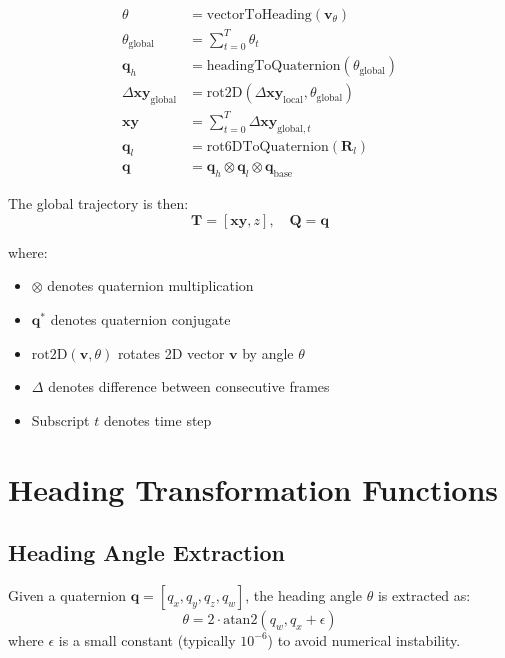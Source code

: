 \begin{align}
    \theta &= \text{vectorToHeading}(\mathbf{v}_{\theta}) \\
    \theta_{\text{global}} &= \sum_{t=0}^T \theta_t \\
    \mathbf{q}_h &= \text{headingToQuaternion}(\theta_{\text{global}}) \\
    \Delta\mathbf{xy}_{\text{global}} &= \text{rot2D}(\Delta\mathbf{xy}_{\text{local}}, \theta_{\text{global}}) \\
    \mathbf{xy} &= \sum_{t=0}^T \Delta\mathbf{xy}_{\text{global},t} \\
    \mathbf{q}_l &= \text{rot6DToQuaternion}(\mathbf{R}_l) \\
    \mathbf{q} &= \mathbf{q}_h \otimes \mathbf{q}_l \otimes \mathbf{q}_{\text{base}}
\end{align}

The global trajectory is then:
\begin{equation}
    \mathbf{T} = [\mathbf{xy}, z], \quad \mathbf{Q} = \mathbf{q}
\end{equation}

where:
\begin{itemize}
    \item $\otimes$ denotes quaternion multiplication
    \item $\mathbf{q}^*$ denotes quaternion conjugate
    \item $\text{rot2D}(\mathbf{v}, \theta)$ rotates 2D vector $\mathbf{v}$ by angle $\theta$
    \item $\Delta$ denotes difference between consecutive frames
    \item Subscript $t$ denotes time step
\end{itemize}


\section*{Heading Transformation Functions}

\subsection*{Heading Angle Extraction}
Given a quaternion $\mathbf{q} = [q_x, q_y, q_z, q_w]$, the heading angle $\theta$ is extracted as:
\begin{equation}
    \theta = 2 \cdot \text{atan2}(q_w, q_x + \epsilon)
\end{equation}
where $\epsilon$ is a small constant (typically $10^{-6}$) to avoid numerical instability.

